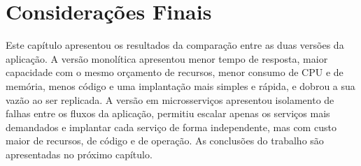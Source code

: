 \section{Considerações Finais}

Este capítulo apresentou os resultados da comparação entre as duas versões da aplicação. A
versão monolítica apresentou menor tempo de resposta, maior capacidade com o mesmo orçamento de
recursos, menor consumo de CPU e de memória, menos código e uma implantação mais simples e
rápida, e dobrou a sua vazão ao ser replicada. A versão em microsserviços apresentou isolamento
de falhas entre os fluxos da aplicação, permitiu escalar apenas os serviços mais demandados e
implantar cada serviço de forma independente, mas com custo maior de recursos, de código e de
operação. As conclusões do trabalho são apresentadas no próximo capítulo.
